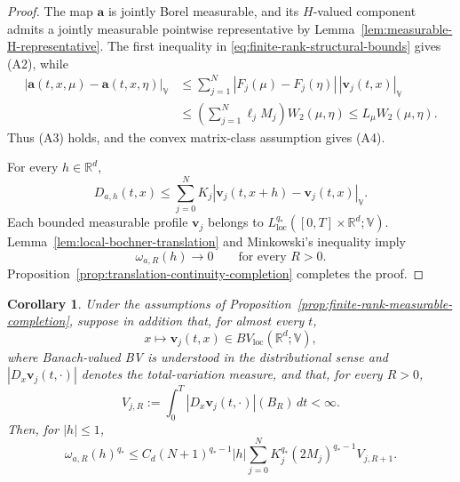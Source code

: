 \documentclass[12pt,oneside, reqno]{amsart}
\newtheorem{corollary}[theorem]{Corollary}
\numberwithin{equation}{section}
\begin{document}
	\begin{proof}
		The map \(\mathbf a\) is jointly Borel measurable, and its \(H\)-valued
		component admits a jointly measurable pointwise representative by
		Lemma~\ref{lem:measurable-H-representative}. The first inequality in
		\eqref{eq:finite-rank-structural-bounds} gives \textnormal{(A2)}, while
		\begin{align*}
			|\mathbf a(t,x,\mu)-\mathbf a(t,x,\eta)|_{\mathbb V}
			&\leq
			\sum_{j=1}^N
			|F_j(\mu)-F_j(\eta)|\,|\mathbf v_j(t,x)|_{\mathbb V}
			\\
			&\leq
			\left(\sum_{j=1}^N\ell_jM_j\right)W_2(\mu,\eta)
			\leq
			L_\mu W_2(\mu,\eta).
		\end{align*}
		Thus \textnormal{(A3)} holds, and the convex matrix-class assumption gives
		\textnormal{(A4)}.
		
		For every \(h\in\mathbb R^d\),
		\begin{equation}
			\label{eq:finite-rank-translation-pointwise}
			D_{a,h}(t,x)
			\leq
			\sum_{j=0}^N
			K_j
			|\mathbf v_j(t,x+h)-\mathbf v_j(t,x)|_{\mathbb V}.
		\end{equation}
		Each bounded measurable profile \(\mathbf v_j\) belongs to
		\(L^{q_\ast}_{\mathrm{loc}}([0,T]\times\mathbb R^d;\mathbb V)\).
		Lemma~\ref{lem:local-bochner-translation} and Minkowski's inequality imply
		\[
		\omega_{a,R}(h)\longrightarrow0
		\qquad\text{for every }R>0.
		\]
		Proposition~\ref{prop:translation-continuity-completion} completes the
		proof.
	\end{proof}
	
	
	
	\begin{corollary}
		\label{cor:finite-rank-bv-rate}
		Under the assumptions of
		Proposition~\ref{prop:finite-rank-measurable-completion}, suppose in addition
		that, for almost every \(t\),
		\[
		x\longmapsto\mathbf v_j(t,x)
		\in BV_{\mathrm{loc}}(\mathbb R^d;\mathbb V),
		\]
		where Banach-valued BV is understood in the distributional sense and
		\(|D_x\mathbf v_j(t,\cdot)|\) denotes the total-variation measure,
		and that, for every \(R>0\),
		\[
		V_{j,R}
		:=
		\int_0^T
		|D_x\mathbf v_j(t,\cdot)|(B_R)\,dt
		<\infty.
		\]
		Then, for \(|h|\leq1\),
		\begin{equation}
			\label{eq:finite-rank-bv-translation-bound}
			\omega_{a,R}(h)^{q_\ast}
			\leq
			C_d(N+1)^{q_\ast-1}|h|
			\sum_{j=0}^N
			K_j^{q_\ast}(2M_j)^{q_\ast-1}V_{j,R+1}.
		\end{equation}
	\end{corollary}
	
\end{document}
